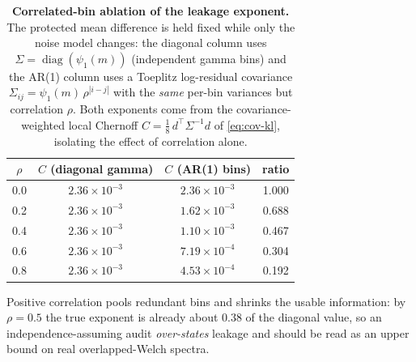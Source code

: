 \documentclass[11pt]{article}
\begin{document}
\begin{table}[htbp]
\centering
\small
\renewcommand{\arraystretch}{1.15}
\caption{\textbf{Correlated-bin ablation of the leakage exponent.} The protected mean difference is held fixed while only the noise model changes: the diagonal column uses $\Sigma=\operatorname{diag}(\psi_1(m))$ (independent gamma bins) and the AR(1) column uses a Toeplitz log-residual covariance $\Sigma_{ij}=\psi_1(m)\,\rho^{|i-j|}$ with the \emph{same} per-bin variances but correlation $\rho$. Both exponents come from the covariance-weighted local Chernoff $C=\tfrac18\,d^\top\Sigma^{-1}d$ of \eqref{eq:cov-kl}, isolating the effect of correlation alone.}
\label{tab:covariance-ablation}
\setlength{\tabcolsep}{8pt}
\begin{tabular}{c c c c}
\toprule
{$\rho$} & {$C$ (diagonal gamma)} & {$C$ (AR(1) bins)} & {ratio} \\
\midrule
0.0 & $2.36\times10^{-3}$ & $2.36\times10^{-3}$ & 1.000 \\
0.2 & $2.36\times10^{-3}$ & $1.62\times10^{-3}$ & 0.688 \\
0.4 & $2.36\times10^{-3}$ & $1.10\times10^{-3}$ & 0.467 \\
0.6 & $2.36\times10^{-3}$ & $7.19\times10^{-4}$ & 0.304 \\
0.8 & $2.36\times10^{-3}$ & $4.53\times10^{-4}$ & 0.192 \\
\bottomrule
\end{tabular}
\par\vspace{3pt}
\begin{minipage}{0.92\linewidth}\footnotesize Positive correlation pools redundant bins and shrinks the usable information: by $\rho=0.5$ the true exponent is already about $0.38$ of the diagonal value, so an independence-assuming audit \emph{over-states} leakage and should be read as an upper bound on real overlapped-Welch spectra.\end{minipage}
\end{table}
\end{document}

